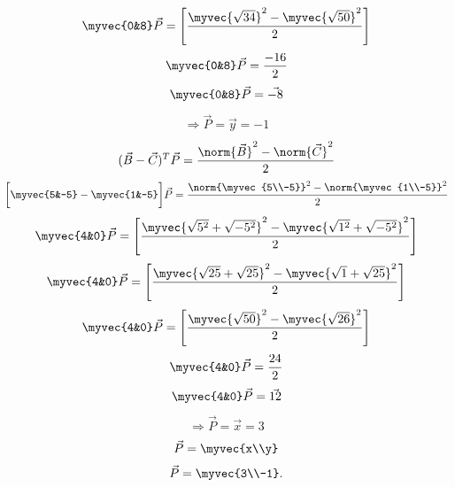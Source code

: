 \documentclass[journal,12pt,twocolumn]{IEEEtran}
\begin{document}
    \begin{align}
        \myvec{0&8}\vec{P}=\Bigg[\frac{\myvec{\sqrt{34}}^2 -\myvec{\sqrt{50}}^2}{2}\Bigg]
    \end{align}
    \begin{align}
        \myvec{0&8}\vec{P}=\frac{-16}{2}
    \end{align}
    \begin{align}
        \myvec{0&8}\vec{P}=\vec{-8}
    \end{align}
    \begin{align}
        \Longrightarrow\vec{P}=\vec{y}=-1
    \end{align}
\begin{align}
    (\vec{B}-\vec{C})^T\vec{P} = \frac{\norm{\vec{B}}^2-\norm{\vec{C}}^2}{{2}}
\end{align}
\begin{align}
    \bigg[\myvec{5&-5} - \myvec{1&-5}\bigg]\vec{P} = \frac{\norm{\myvec{5\\-5}}^2-\norm{\myvec{1\\-5}}^2}{2}
\end{align}
    \begin{align}
        \myvec{4&0}\vec{P} =\Bigg[\frac{\myvec{\sqrt{5^2}+\sqrt{-5^2}}^2 -\myvec{\sqrt{1^2}+\sqrt{-5^2}}^2}{2}\Bigg]
    \end{align}
    \begin{align}
        \myvec{4&0}\vec{P}=\Bigg[\frac{\myvec{\sqrt{25}+\sqrt{25}}^2 -\myvec{\sqrt{1}+\sqrt{25}}^2}{2}\Bigg]
    \end{align}
    \begin{align}
        \myvec{4&0}\vec{P}=\Bigg[\frac{\myvec{\sqrt{50}}^2 -\myvec{\sqrt{26}}^2}{2}\Bigg]
    \end{align}
    \begin{align}
        \myvec{4&0}\vec{P}=\frac{24}{2}
    \end{align}
    \begin{align}
        \myvec{4&0}\vec{P}=\vec{12}
    \end{align}
    \begin{align}
         \Longrightarrow\vec{P}=\vec{x}=3
    \end{align}
    \begin{align}
        \Vec{P}=\myvec{x\\y}
    \end{align}
    \begin{align}
    \vec{P}=\myvec{3\\-1}.
\end{align}
\end{document}
